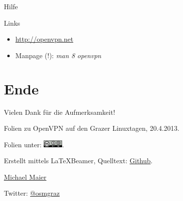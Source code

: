\documentclass{beamer}
\begin{document}
\begin{frame}{Hilfe}

Links

\begin{itemize}
	\item \url{http://openvpn.net}
	\item Manpage (!): \emph{man 8 openvpn}
\end{itemize}

\end{frame}

\section{Ende}

\begin{frame}{Vielen Dank für die Aufmerksamkeit!}

  Folien zu OpenVPN auf den Grazer Linuxtagen, 20.4.2013.
\vspace{1cm}

Folien unter: \includegraphics[width=1cm]{cc-by-sa.png}.
\vspace{1cm}

Erstellt mittels \LaTeX Beamer, Quelltext: \href{https://github.com/species/vortrag-openvpn-glt13}{Github}.
\vspace{1cm}

\href{mailto:michael.maier@student.tugraz.at}{Michael Maier}

Twitter: \href{https://twitter.com/osmgraz}{@osmgraz}
\end{frame}
\end{document}

